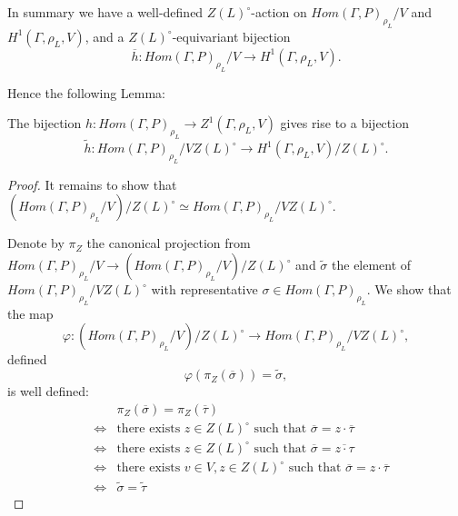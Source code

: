 In summary we have a well-defined $Z(L)^\circ$-action on $Hom(\Gamma, P)_{\rho_L}/V$ and $H^1(\Gamma, \rho_L, V)$, and a $Z(L)^\circ$-equivariant bijection 
\begin{displaymath}
  \overline{h}:Hom(\Gamma, P)_{\rho_L}/V \rightarrow H^1(\Gamma, \rho_L, V).
\end{displaymath}

Hence the following Lemma:

\begin{lemma}
  The bijection $h: Hom(\Gamma, P)_{\rho_L} \rightarrow Z^1(\Gamma, \rho_L, V)$ gives rise to a bijection
  \begin{displaymath}
    \tilde{h}: Hom(\Gamma, P)_{\rho_L}/VZ(L)^\circ \rightarrow H^1(\Gamma, \rho_L, V)/Z(L)^\circ.
  \end{displaymath}
  \label{lem:vzl_h1zl}
\end{lemma}
\begin{proof}
  It remains to show that $\left(Hom(\Gamma, P)_{\rho_L}/V\right)/Z(L)^\circ \simeq Hom(\Gamma, P)_{\rho_L}/VZ(L)^\circ$.

  Denote by $\pi_Z$ the canonical projection from $Hom(\Gamma, P)_{\rho_L}/V \rightarrow \left( Hom(\Gamma, P)_{\rho_L}/V \right)/Z(L)^\circ$ and $\tilde{\sigma}$ the element of $Hom(\Gamma, P)_{\rho_L}/VZ(L)^\circ$ with representative $\sigma \in Hom(\Gamma, P)_{\rho_L}$. We show that the map
  \begin{displaymath}
    \varphi: (Hom(\Gamma, P)_{\rho_L}/V)/Z(L)^\circ \rightarrow Hom(\Gamma, P)_{\rho_L}/VZ(L)^\circ,
  \end{displaymath}
  defined
  \begin{displaymath}
    \varphi(\pi_Z(\overline{\sigma})) = \tilde{\sigma},
  \end{displaymath}
  is well defined:
  \begin{eqnarray*}
    && \pi_Z(\overline{\sigma}) = \pi_Z(\overline{\tau}) \\
    &\Longleftrightarrow& \textrm{there exists } z \in Z(L)^\circ \textrm{ such that } \overline{\sigma} = z \cdot \overline{\tau} \\
    &\Longleftrightarrow& \textrm{there exists } z \in Z(L)^\circ \textrm{ such that } \overline{\sigma} = \overline{z \cdot \tau} \\
    &\Longleftrightarrow& \textrm{there exists } v \in V, z \in Z(L)^\circ \textrm{ such that } \overline{\sigma} = z \cdot \overline{\tau} \\
    &\Longleftrightarrow& \tilde{\sigma} = \tilde{\tau}
  \end{eqnarray*}
\end{proof}

